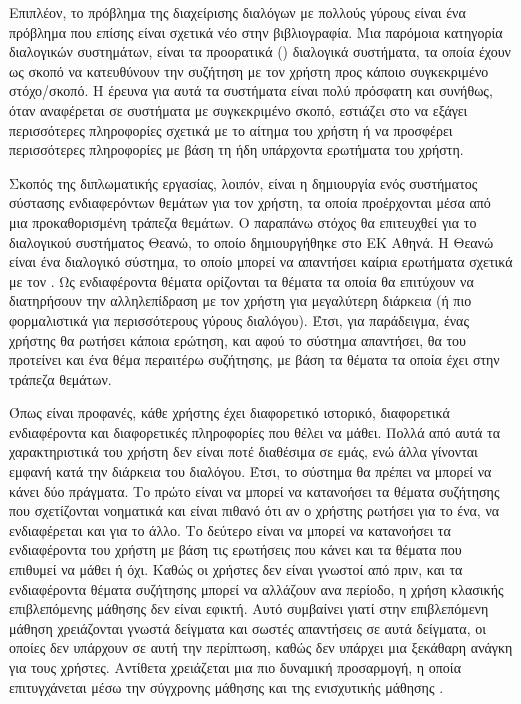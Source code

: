 Επιπλέον, το πρόβλημα της διαχείρισης διαλόγων με πολλούς γύρους είναι ένα πρόβλημα που επίσης είναι σχετικά νέο στην βιβλιογραφία\cite{yi2024surveyrecentadvancesllmbased}\cite{ni2022recentadvancesdeeplearning}.
Μια παρόμοια κατηγορία διαλογικών συστημάτων, είναι τα προορατικά () διαλογικά συστήματα, τα οποία έχουν ως σκοπό να κατευθύνουν την συζήτηση με τον χρήστη
προς κάποιο συγκεκριμένο στόχο/σκοπό. Η έρευνα για αυτά τα συστήματα είναι πολύ πρόσφατη και συνήθως, όταν αναφέρεται σε συστήματα με συγκεκριμένο σκοπό, εστιάζει στο
να εξάγει περισσότερες πληροφορίες σχετικά με το αίτημα του χρήστη ή να προσφέρει περισσότερες πληροφορίες με βάση τη ήδη υπάρχοντα ερωτήματα του χρήστη\cite{Deng2023ASO}.

Σκοπός της διπλωματικής εργασίας, λοιπόν, είναι η δημιουργία ενός συστήματος σύστασης ενδιαφερόντων θεμάτων για τον χρήστη, τα οποία προέρχονται μέσα από μια προκαθορισμένη τράπεζα θεμάτων.
Ο παραπάνω στόχος θα επιτευχθεί για το διαλογικού συστήματος Θεανώ, το οποίο δημιουργήθηκε στο ΕΚ Αθηνά.
Η Θεανώ είναι ένα διαλογικό σύστημα, το οποίο μπορεί να απαντήσει καίρια ερωτήματα σχετικά με τον .
Ως ενδιαφέροντα θέματα ορίζονται τα θέματα τα οποία θα επιτύχουν να διατηρήσουν την αλληλεπίδραση με τον χρήστη για μεγαλύτερη διάρκεια (ή πιο φορμαλιστικά για περισσότερους γύρους διαλόγου).
Έτσι, για παράδειγμα, ένας χρήστης θα ρωτήσει κάποια ερώτηση, και αφού το σύστημα απαντήσει,
θα του προτείνει και ένα θέμα περαιτέρω συζήτησης, με βάση τα θέματα τα οποία έχει στην τράπεζα θεμάτων.

Όπως είναι προφανές, κάθε χρήστης έχει διαφορετικό ιστορικό, διαφορετικά ενδιαφέροντα και διαφορετικές πληροφορίες που θέλει να μάθει.
Πολλά από αυτά τα χαρακτηριστικά του χρήστη δεν είναι ποτέ διαθέσιμα σε εμάς, ενώ άλλα γίνονται εμφανή κατά την διάρκεια του διαλόγου.
Έτσι, το σύστημα θα πρέπει να μπορεί να κάνει δύο πράγματα. Το πρώτο είναι να μπορεί να κατανοήσει τα θέματα συζήτησης που σχετίζονται νοηματικά και
είναι πιθανό ότι αν ο χρήστης ρωτήσει για το ένα, να ενδιαφέρεται και για το άλλο. Το δεύτερο είναι να μπορεί να κατανοήσει τα ενδιαφέροντα του χρήστη με βάση τις
ερωτήσεις που κάνει και τα θέματα που επιθυμεί να μάθει ή όχι. Καθώς οι χρήστες δεν είναι γνωστοί από πριν, και τα ενδιαφέροντα θέματα συζήτησης μπορεί να
αλλάζουν ανα περίοδο, η χρήση κλασικής επιβλεπόμενης μάθησης δεν είναι εφικτή. Αυτό συμβαίνει γιατί στην επιβλεπόμενη μάθηση χρειάζονται γνωστά
δείγματα και σωστές απαντήσεις σε αυτά δείγματα, οι οποίες δεν υπάρχουν σε αυτή την περίπτωση, καθώς δεν υπάρχει μια ξεκάθαρη ανάγκη για τους χρήστες.
Αντίθετα χρειάζεται μια πιο δυναμική προσαρμογή, η οποία επιτυγχάνεται μέσω την σύγχρονης μάθησης  και της ενισχυτικής μάθησης
.

